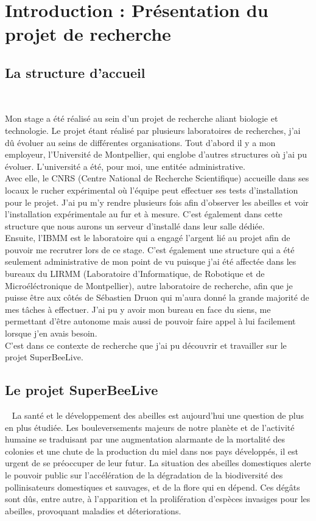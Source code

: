 \documentclass[11pt,french,a4paper]{report}
\begin{document}
\tableofcontents

\clearpage

\chapter{Introduction : Présentation du projet de recherche}
\section{La structure d'accueil} 

Mon stage a été réalisé au sein d'un projet de recherche aliant biologie et technologie. 
Le projet étant réalisé par plusieurs laboratoires de recherches, j'ai dû évoluer au seins de différentes organisations. 
Tout d'abord il y a mon employeur, l'Université de Montpellier, qui englobe d'autres structures où j'ai pu évoluer. 
L'université a été, pour moi, une entitée administrative. \\ 
Avec elle, le CNRS (Centre National de Recherche Scientifique) accueille dans ses locaux le rucher expérimental où 
l'équipe peut effectuer ses tests d'installation pour le projet. J'ai pu m'y rendre plusieurs fois afin d'observer les abeilles
et voir l'installation expérimentale au fur et à mesure. C'est également dans cette structure que nous aurons un serveur 
d'installé dans leur salle dédiée.\\
Ensuite, l'IBMM est le laboratoire qui a engagé l'argent lié au projet afin de pouvoir me recrutrer lors de ce stage. 
C'est également une structure qui a été seulement administrative de mon point de vu puisque j'ai été affectée dans 
les bureaux du LIRMM (Laboratoire d'Informatique, de Robotique et de Microéléctronique de Montpellier), autre laboratoire de 
recherche, afin que je puisse être aux côtés de Sébastien Druon qui m'aura donné la grande majorité de mes tâches à effectuer. 
J'ai pu y avoir mon bureau en face du siens, me permettant d'être autonome mais aussi de pouvoir faire
appel à lui facilement lorsque j'en avais besoin.\\
C'est dans ce contexte de recherche que j'ai pu découvrir et travailler sur le projet SuperBeeLive. \\ 


\section{Le projet SuperBeeLive}
 
La santé et le développement des abeilles est aujourd’hui une question de plus en plus étudiée. Les bouleversements
majeurs de notre planète et de l’activité humaine se traduisant par une augmentation alarmante de la mortalité
des colonies et une chute de la production du miel dans nos pays développés, il est urgent de se préoccuper de leur futur. 
La situation des abeilles domestiques alerte le pouvoir public sur l’accélération de la dégradation de la biodiversité des 
pollinisateurs domestiques et sauvages, et de la flore qui en dépend. Ces dégâts sont dûs, entre autre, à l’apparition 
et la prolifération d’espèces invasiges pour les abeilles, provoquant maladies et déteriorations. 
\end{document}
